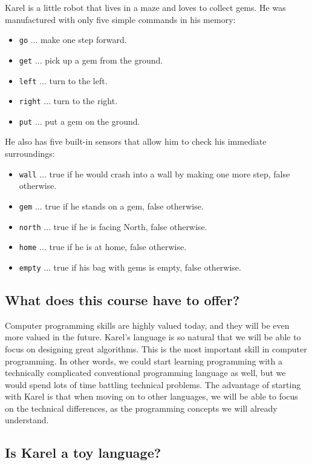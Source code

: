 Karel is a little robot that lives in a maze and loves to collect gems.
He was manufactured with only five simple commands in his memory:
\begin{itemize}
\item {\color{blue} \tt go} ... make one step forward.
\item {\color{blue} \tt get} ... pick up a gem from the ground. 
\item {\color{blue} \tt left} ... turn to the left.
\item {\color{blue} \tt right} ... turn to the right. 
\item {\color{blue} \tt put} ... put a gem on the ground. 
\end{itemize}
He also has five built-in sensors that allow him to check his immediate surroundings:
\begin{itemize}
\item {\color{blue} \tt wall} ... true if he would crash into a wall by making one more step, false otherwise. 
\item {\color{blue} \tt gem} ... true if he stands on a gem, false otherwise.
\item {\color{blue} \tt north} ... true if he is facing North, false otherwise.
\item {\color{blue} \tt home} ... true if he is at home, false otherwise.
\item {\color{blue} \tt empty} ... true if his bag with gems is empty, false otherwise. 
\end{itemize}

\subsection{What does this course have to offer?}

Computer programming skills are highly valued today, and they will be even more 
valued in the future. Karel's language is so natural that we will be able to 
focus on designing great algorithms. This is the most important skill in 
computer programming. In other words, we could start learning programming 
with a technically 
complicated conventional programming language as well, but we would spend lots of time 
battling technical problems. The advantage of starting with Karel is that 
when moving on to other languages, we will be able to focus on the technical 
differences, as the programming concepts we will already understand.


\subsection{Is Karel a toy language?}

